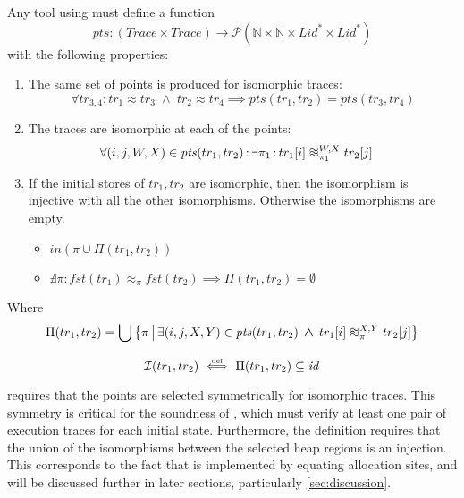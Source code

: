 \documentclass[runningheads,a4paper]{llncs}
\DeclareMathOperator{\band}{\bm{\;\land\;}}
\DeclareMathOperator{\suchthat}{:}
\newcommand*{\qvars}[2]{#1_{#2}}
\newcommand*{\powerset}[1]{\mathcal{P}(#1)}
\newcommand*{\identity}[0]{\mathit{id}}
\newcommand*{\defiff}{\stackrel{\text{\tiny def}}{\iff}}
\newcommand*{\setcomp}[2]{\left\{#1\,\middle|\,#2\right\}}
\newcommand*{\nat}{\mathbb{N}}
\newcommand*{\first}[1]{\mathit{fst}(#1)}
\newcommand*{\Trace}{\mathit{Trace}}
\newcommand{\tr}{tr}
\newcommand*\iso{\approx}
\newcommand*{\LVar}{\mathit{Lid}}
\newcommand*{\bijection}[1]{\mathit{in}{\left(#1\right)}}
\newcommand*{\wiso}{%
  \mathrel{\vcenter{\offinterlineskip
  \hbox{$\sim$}\vskip-.35ex\hbox{$\sim$}\vskip-.35ex\hbox{$\sim$}}}}
\newcommand*{\myIsoCompatibleStates}{\mathit{pts}}
\newcommand*{\isoR}{\mathcal{I}}
\begin{document}
\begin{definition}\label{def:isomorphic points}\setlength{\parindent}{0cm}
	
	Any tool using \metho{} must define a function
	\[\myIsoCompatibleStates : (\Trace\times\Trace) \rightarrow \powerset{\nat \times \nat \times \LVar^* \times \LVar^*}\]
	with the following properties: 
	\begin{enumerate}
		\item The same set of points is produced for isomorphic traces:
		\[
			\forall \qvars{\tr}{3,4} \suchthat \tr_1\iso\tr_3 \band \tr_2\iso\tr_4 
			\implies \myIsoCompatibleStates(\tr_1,\tr_2) = \myIsoCompatibleStates(\tr_3,\tr_4)
		\]
		\item The traces are isomorphic at each of the points:
		\[\begin{aligned}
			&\forall (i,j,W,X)\in \myIsoCompatibleStates(\tr_1,\tr_2) \suchthat \exists \pi_1 \suchthat \tr_1[i] \wiso_{\pi_1}^{W,X} \tr_2[j]
		\end{aligned}\]
		\item If the initial stores of $\tr_1,\tr_2$ are isomorphic, then the isomorphism is injective with all the other isomorphisms. Otherwise the isomorphisms are empty. 
		\begin{itemize}
			\item $\bijection{\pi \cup \Pi(\tr_1,\tr_2)}$
			\item $\nexists \pi \suchthat \first{\tr_1} \iso_{\pi} \first{\tr_2} \implies \Pi(\tr_1,\tr_2) = \emptyset$
		\end{itemize}
	\end{enumerate}
	Where
	\[\begin{aligned}
		\Pi(\tr_1,\tr_2) = \bigcup\setcomp{\pi}{\exists (i,j,X,Y) \in \myIsoCompatibleStates(\tr_1,\tr_2) \band \tr_1[i] \wiso_{\pi}^{X,Y} \tr_2[j]}
	\end{aligned}\]
\end{definition}

\begin{definition}\label{def:my compatible isomorphic states}\setlength{\parindent}{0cm}
\[\isoR(\tr_1,\tr_2) \defiff \Pi(\tr_1,\tr_2) \subseteq \identity\]
\end{definition}

 requires that the points are selected symmetrically for isomorphic traces. This symmetry is critical for the soundness of \metho{}, which must verify at least one pair of execution traces for each initial state. Furthermore, the definition requires that the union of the isomorphisms between the selected heap regions is an injection. This corresponds to the fact that \metho{} is implemented by equating allocation sites, and will be discussed further in later sections, particularly \cref{sec:discussion}.
\end{document}
